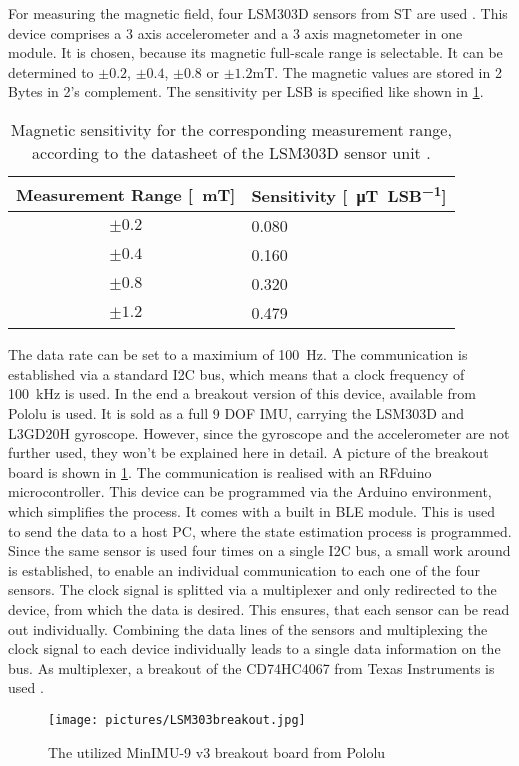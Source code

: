 For measuring the magnetic field, four LSM303D sensors from ST are used \cite{STlsm2012}. This device comprises a 3 axis accelerometer and a 3 axis magnetometer in one module. It is chosen, because its magnetic full-scale range is selectable. It can be determined to $ \pm 0.2$, $ \pm 0.4 $, $ \pm 0.8 $ or $ \pm 1.2\si{\milli\tesla} $. The magnetic values are stored in 2 Bytes in 2's complement. The sensitivity per \ac{LSB} is specified like shown in \ref{tab:magSensitivity}.
\begin{table}[h]
\centering
\begin{tabular}{c|l}
\textbf{Measurement Range [\SI{}{\milli\tesla}]} & \textbf{Sensitivity [\SI{}{\micro\tesla \per LSB}]} \\ \hline
$ \pm 0.2 $ & 0.080 \\ \hline
$ \pm 0.4 $ & 0.160 \\ \hline
$ \pm 0.8 $ & 0.320 \\ \hline
$ \pm 1.2 $ & 0.479 \\ %
\end{tabular}
\caption[Magnetic sensitivity]{Magnetic sensitivity for the corresponding measurement range, according to the datasheet of the LSM303D sensor unit \cite{STlsm2012}.}
\label{tab:magSensitivity}
\end{table}
The data rate can be set to a maximium of \SI{100}{\Hz}. The communication is established via a standard I2C bus, which means that a clock frequency of \SI{100}{\kilo \Hz} is used. In the end a breakout version of this device, available from Pololu \cite{pol2016} is used. It is sold as a full 9 \ac{DOF} IMU, carrying the LSM303D and L3GD20H gyroscope. However, since the gyroscope and the accelerometer are not further used, they won't be explained here in detail. A picture of the breakout board is shown in \ref{fig:breakout}. The communication is realised with an RFduino microcontroller. This device can be programmed via the Arduino environment, which simplifies the process. It comes with a built in \ac{BLE} module. This is used to send the data to a host PC, where the state estimation process is programmed. Since the same sensor is used four times on a single I2C bus, a small work around is established, to enable an individual communication to each one of the four sensors. The clock signal is splitted via a multiplexer and only redirected to the device, from which the data is desired. This ensures, that each sensor can be read out individually. Combining the data lines of the sensors and multiplexing the clock signal to each device individually leads to a single data information on the bus. As multiplexer, a breakout of the CD74HC4067 from Texas Instruments is used \cite{TImux2003}.
\begin{figure}
\centering
\texttt{[image: pictures/LSM303breakout.jpg]}
\caption[Breakout board of sensor unit]
{The utilized MinIMU-9 v3 breakout board from Pololu \cite{pol2016}}
\label{fig:breakout}
\end{figure}

